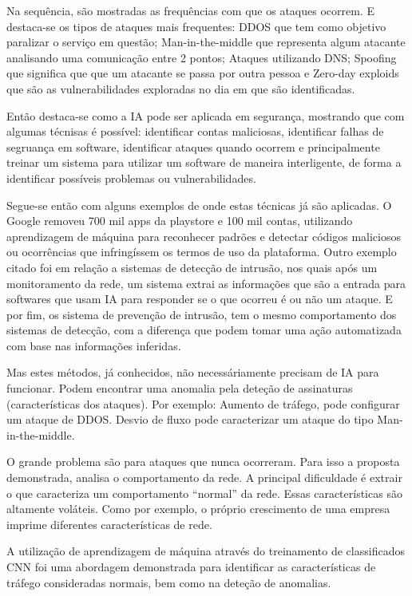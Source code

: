\documentclass[12pt]{article}
\begin{document}
Na sequência, são mostradas as frequências com que os ataques ocorrem. E destaca-se os tipos de ataques mais frequentes: DDOS que tem como objetivo paralizar o serviço em questão; Man-in-the-middle que representa algum atacante analisando uma comunicação entre 2 pontos; Ataques utilizando DNS; Spoofing que significa que que um atacante se passa por outra pessoa e Zero-day exploids que são as vulnerabilidades exploradas no dia em que são identificadas.

Então destaca-se como a IA pode ser aplicada em segurança, mostrando que com algumas técnisas é possível: identificar contas maliciosas, identificar falhas de segruança em software, identificar ataques quando ocorrem e principalmente treinar um sistema para utilizar um software de maneira interligente, de forma a identificar possíveis problemas ou vulnerabilidades.

Segue-se então com alguns exemplos de onde estas técnicas já são aplicadas. O Google removeu 700 mil apps da playstore e 100 mil contas, utilizando aprendizagem de máquina para reconhecer padrões e detectar códigos maliciosos ou ocorrências que infringíssem os termos de uso da plataforma. Outro exemplo citado foi em relação a sistemas de detecção de intrusão, nos quais após um monitoramento da rede, um sistema extrai as informações que são a entrada para softwares que usam IA para responder se o que ocorreu é ou não um ataque. E por fim, os sistema de prevenção de intrusão, tem o mesmo comportamento dos sistemas de detecção, com a diferença que podem tomar uma ação automatizada com base nas informações inferidas.

Mas estes métodos, já conhecidos, não necessáriamente precisam de IA para funcionar. Podem encontrar uma anomalia pela deteção de assinaturas (características dos ataques). Por exemplo: Aumento de tráfego, pode configurar um ataque de DDOS. Desvio de fluxo pode caracterizar um ataque do tipo Man-in-the-middle.

O grande problema são para ataques que nunca ocorreram. Para isso a proposta demonstrada, analisa o comportamento da rede. A principal dificuldade é extrair o que caracteriza um comportamento ``normal'' da rede. Essas características são altamente voláteis. Como por exemplo, o próprio crescimento de uma empresa imprime diferentes características de rede.

A utilização de aprendizagem de máquina através do treinamento de classificados CNN foi uma abordagem demonstrada para identificar as características de tráfego consideradas normais, bem como na deteção de anomalias.
\end{document}
